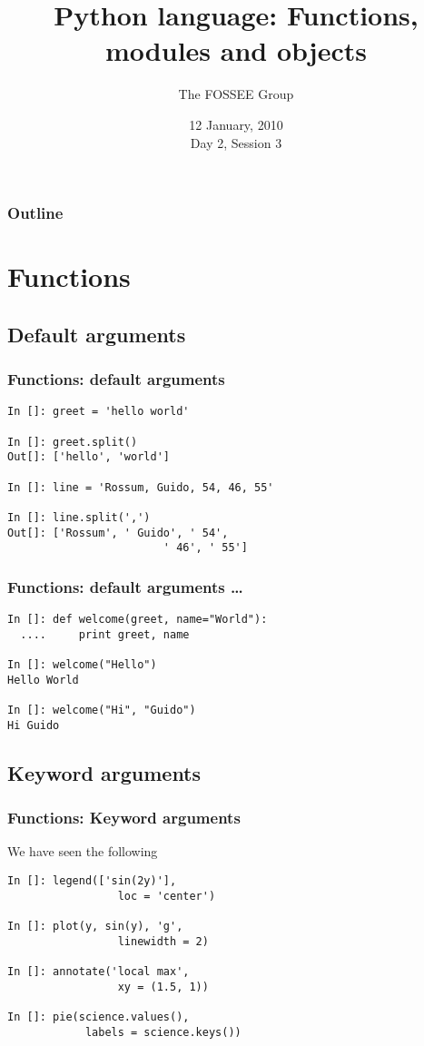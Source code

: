 \documentclass[14pt,compress]{beamer}
\title[Basic Python]{Python language: Functions, modules and objects}
\author[FOSSEE Team] {The FOSSEE Group}
\institute[IIT Bombay] {Department of Aerospace Engineering\\IIT Bombay}
\date[] {12 January, 2010\\Day 2, Session 3}
\begin{document}
\begin{frame}
  \titlepage
\end{frame}

\begin{frame}
  \frametitle{Outline}
  \tableofcontents
\end{frame}

\section{Functions}
\subsection{Default arguments}
\begin{frame}[fragile]
  \frametitle{Functions: default arguments}
  \begin{lstlisting}
In []: greet = 'hello world'

In []: greet.split()
Out[]: ['hello', 'world']

In []: line = 'Rossum, Guido, 54, 46, 55'

In []: line.split(',')
Out[]: ['Rossum', ' Guido', ' 54',
                        ' 46', ' 55']
  \end{lstlisting}
\end{frame}

\begin{frame}[fragile]
  \frametitle{Functions: default arguments \ldots}
  \begin{lstlisting}
In []: def welcome(greet, name="World"):
  ....     print greet, name

In []: welcome("Hello")
Hello World

In []: welcome("Hi", "Guido")
Hi Guido
  \end{lstlisting}
\end{frame} 

\subsection{Keyword arguments}
\begin{frame}[fragile]
  \frametitle{Functions: Keyword arguments}
We have seen the following
\begin{lstlisting}
In []: legend(['sin(2y)'], 
                 loc = 'center')

In []: plot(y, sin(y), 'g',
                 linewidth = 2)

In []: annotate('local max',
                 xy = (1.5, 1))

In []: pie(science.values(),
            labels = science.keys())
  \end{lstlisting}
\end{frame}
\end{document}
